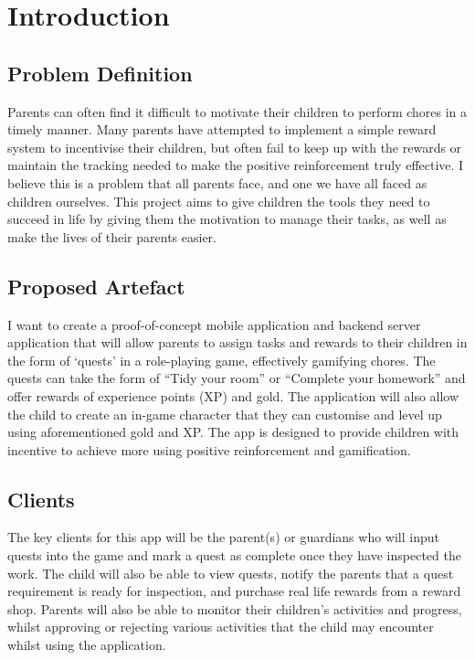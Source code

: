 \chapter{Introduction}
\label{chap:intro}

\section{Problem Definition}
Parents can often find it difficult to motivate their children to perform chores in a timely manner. 
Many parents have attempted to implement a simple reward system to incentivise their children, but often fail to keep up with the rewards or maintain the tracking needed to make the positive reinforcement truly effective.
I believe this is a problem that all parents face, and one we have all faced as children ourselves.  
This project aims to give children the tools they need to succeed in life by giving them the motivation to manage their tasks, as well as make the lives of their parents easier.

\section{Proposed Artefact}
I want to create a proof-of-concept mobile application and backend server application that will allow parents to assign tasks and rewards to their children in the form of `quests' in a role-playing game, effectively gamifying chores. 
The quests can take the form of ``Tidy your room'' or ``Complete your homework'' and offer rewards of experience points (XP) and gold. The application will also allow the child to create an in-game character that they can customise and level up using aforementioned gold and XP.
The app is designed to provide children with incentive to achieve more using positive reinforcement and gamification. 

\section{Clients}
The key clients for this app will be the parent(s) or guardians who will input quests into the game and mark a quest as complete once they have inspected the work. 
The child will also be able to view quests, notify the parents that a quest requirement is ready for inspection, and purchase real life rewards from a reward shop.
Parents will also be able to monitor their children's activities and progress, whilst approving or rejecting various activities that the child may encounter whilst using the application. 

